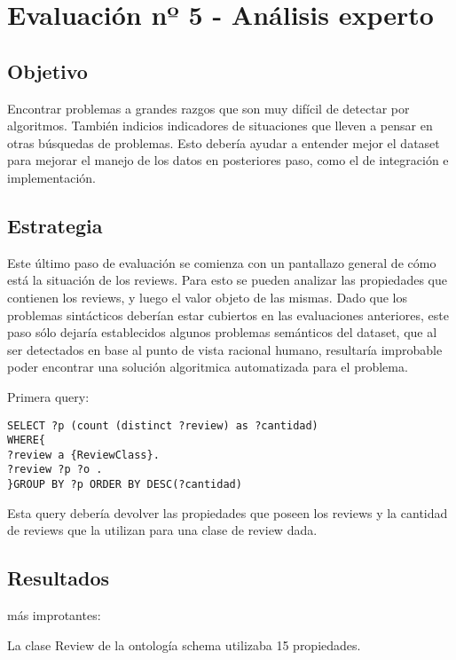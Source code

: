 \section{Evaluación nº 5 - Análisis experto}
\label{section:evaluacion-analisis}

\subsection*{Objetivo} Encontrar problemas a grandes razgos que son muy difícil de detectar por algoritmos. También indicios indicadores de 
situaciones que lleven a pensar en otras búsquedas de problemas. Esto debería ayudar a entender mejor el dataset para mejorar el manejo 
de los datos en posteriores paso, como el de integración e implementación.

\subsection*{Estrategia} Este último paso de evaluación se comienza con un pantallazo general de cómo está la situación de los reviews. Para esto se pueden analizar las propiedades que contienen los reviews, y luego el valor objeto 
de las mismas. Dado que los problemas sintácticos deberían estar cubiertos en las evaluaciones anteriores, este paso sólo dejaría establecidos
algunos problemas semánticos del dataset, que al ser detectados en base al punto de vista racional humano, resultaría improbable poder encontrar
una solución algoritmica automatizada para el problema.

Primera query:

\begin{lstlisting}[frame=single]
SELECT ?p (count (distinct ?review) as ?cantidad) 
WHERE{
?review a {ReviewClass}.
?review ?p ?o .
}GROUP BY ?p ORDER BY DESC(?cantidad)
\end{lstlisting}

Esta query debería devolver las propiedades que poseen los reviews y la cantidad de reviews que la utilizan para una clase de review dada.

\subsection*{Resultados} más improtantes:

La clase Review de la ontología schema utilizaba 15 propiedades. 


